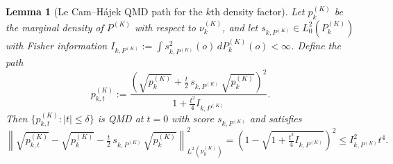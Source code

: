 \documentclass[11pt]{article}
\theoremstyle{plain}
\newtheorem{lemma}{Lemma}
\theoremstyle{definition}
\theoremstyle{remark}
\theoremstyle{definition}
\begin{document}
\begin{lemma}[Le Cam--Hájek QMD path for the $k$th density factor]
Let $p_k^{(K)}$ be the marginal density of $P^{(K)}$ with respect to $\nu_k^{(K)}$, and let $s_{k,P^{(K)}} \in L_0^2(P_k^{(K)})$ with Fisher information $I_{k,P^{(K)}} := \int s_{k,P^{(K)}}^2(o)\,dP_k^{(K)}(o) < \infty$. Define the path
\[
p_{k,t}^{(K)} := \frac{\left( \sqrt{p_k^{(K)}} + \tfrac{t}{2}\,s_{k,P^{(K)}}\,\sqrt{p_k^{(K)}} \right)^2}{1 + \tfrac{t^2}{4}I_{k,P^{(K)}}}.
\]
Then $\{p_{k,t}^{(K)} : |t| \le \delta\}$ is QMD at $t = 0$ with score $s_{k,P^{(K)}}$ and satisfies
\[
\left\| \sqrt{p_{k,t}^{(K)}} - \sqrt{p_k^{(K)}} - \tfrac{t}{2}\,s_{k,P^{(K)}}\,\sqrt{p_k^{(K)}} \right\|_{L^2(\nu_k^{(K)})}^2
= \left( 1 - \sqrt{1 + \tfrac{t^2}{4}I_{k,P^{(K)}}} \right)^2 \leq I_{k,P^{(K)}}^2 t^4.
\] \label{lemma:hajeklecampath}
\end{lemma}
\end{document}

